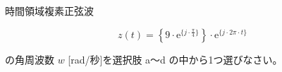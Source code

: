 時間領域複素正弦波

\[
z(t) =  \left \{ 9 \cdot \textrm{e}^{\{j \cdot \frac{\pi}{4} \}} \right \} \cdot \textrm{e}^{\{ j \cdot 2\pi \cdot t \}}
\]

\bigskip
\noindent の角周波数 $w$ [rad/秒]を選択肢 a〜d の中から1つ選びなさい。
